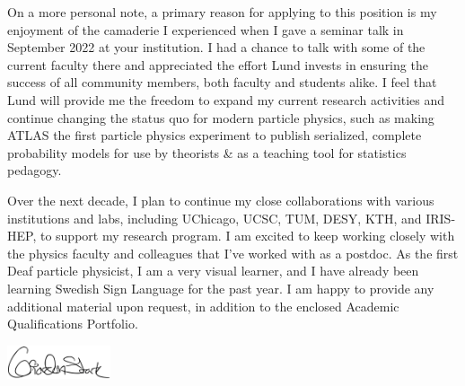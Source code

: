 On a more personal note, a primary reason for applying to this position is my enjoyment of the camaderie I experienced when I gave a seminar talk in September 2022 at your institution. I had a chance to talk with some of the current faculty there and appreciated the effort Lund invests in ensuring the success of all community members, both faculty and students alike. I feel that Lund will provide me the freedom to expand my current research activities and continue changing the status quo for modern particle physics, such as making ATLAS the first particle physics experiment to publish serialized, complete probability models for use by theorists \& as a teaching tool for statistics pedagogy.

Over the next decade, I plan to continue my close collaborations with various institutions and labs, including UChicago, UCSC, TUM, DESY, KTH, and IRIS-HEP, to support my research program. I am excited to keep working closely with the physics faculty and colleagues that I've worked with as a postdoc. As the first Deaf particle physicist, I am a very visual learner, and I have already been learning Swedish Sign Language for the past year. I am happy to provide any additional material upon request, in addition to the enclosed Academic Qualifications Portfolio.

\includegraphics[height=1cm]{attachments/signature}
\vfill%
